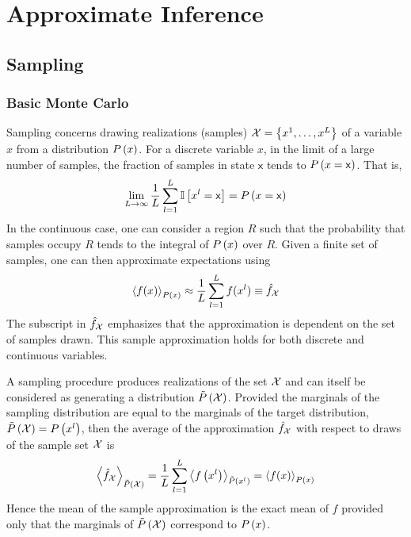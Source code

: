 
\chapter{Approximate Inference}
\label{chapter12}



\section{Sampling}
\label{section12.1}

\subsection{Basic Monte Carlo}

Sampling concerns drawing realizations (samples) $\cX=\left\{x^1,\dotsc,x^L\right\}$ of a variable $x$ from a distribution $\P{x}$. For a discrete variable $x$, in the limit of a large number of samples, the fraction of samples in state $\mathsf{x}$ tends to $\P{x=\mathsf{x}}$. That is,
\begin{align*}
\lim_{L\to\infty}\frac{1}{L}\sum_{l=1}^L\bI\left[x^l=\mathsf{x}\right]=\P{x=\mathsf{x}}
\end{align*}
In the continuous case, one can consider a region $R$ such that the probability that samples occupy $R$ tends to the integral of $\P{x}$ over $R$. Given a finite set of samples, one can then approximate expectations using
\begin{align*}
\vecx{f(x)}_{\P{x}}\approx\frac{1}{L}\sum_{l=1}^Lf(x^l)\equiv\hat{f}_\cX
\end{align*}
The subscript in $\hat{f}_\cX$ emphasizes that the approximation is dependent on the set of samples drawn. This sample approximation holds for both discrete and continuous variables.

A sampling procedure produces realizations of the set $\cX$ and can itself be considered as generating a distribution $\ti{P}\left(\cX\right)$. Provided the marginals of the sampling distribution are equal to the marginals of the target distribution, $\ti{P}\left(\cX\right)=\P{x^l}$, then the average of the approximation $\hat{f}_\cX$ with respect to draws of the sample set $\cX$ is
\begin{align*}
\vecx{\hat{f}_\cX}_{\ti{P}\left(\cX\right)}=\frac{1}{L}\sum_{l=1}^L\vecx{f\left(x^l\right)}_{\ti{P}\left(x^l\right)}=\vecx{f(x)}_{\P{x}}
\end{align*}
Hence the mean of the sample approximation is the exact mean of $f$ provided only that the marginals of $\ti{P}\left(\cX\right)$ correspond to $\P{x}$.

